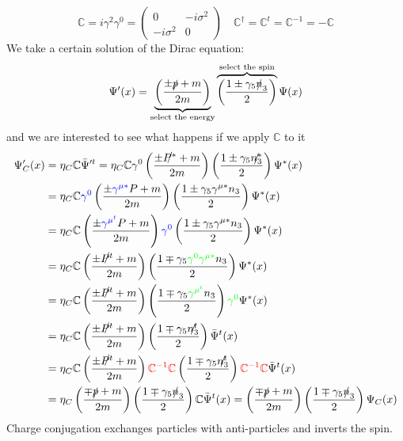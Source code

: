 \documentclass[../main.tex]{subfiles}
\begin{document}
\[
\mathbb{C}=i\gamma^2\gamma^0=\left(\begin{array}{cc}
    0 & -i\sigma^2 \\
    -i\sigma^2 & 0
\end{array}\right)
\quad \mathbb{C}^\dagger=\mathbb{C}^t=\mathbb{C}^{-1}=-\mathbb{C}
\]
We take a certain solution of the Dirac equation:
\[
\Psi'(x)=\underbrace{\left(\frac{\pm\slashed{p}+m}{2m}\right)}_{\text{select the energy}}\overbrace{\left(\frac{1\pm\gamma_5\slashed{n}_3}{2}\right)}^{\text{select the spin}}\Psi(x)
\]
and we are interested to see what happens if we apply $\mathbb{C}$ to it
\begin{align*}
\Psi'_C(x)&=\eta_C\mathbb{C}\bar{\Psi}'^t=\eta_C\mathbb{C}\gamma^0\left(\frac{\pm\slashed{P^*}+m}{2m}\right)\left(\frac{1\pm\gamma_5\slashed{n^*_3}}{2}\right)\Psi^*(x)\\
&=\eta_C\mathbb{C}{\color{blue}\gamma^0}\left(\frac{\pm{\color{blue}\gamma^{\mu*}}P+m}{2m}\right)\left(\frac{1\pm\gamma_5\gamma^{\mu*}n_3}{2}\right)\Psi^*(x)\\
&=\eta_C\mathbb{C}\left(\frac{\pm{\color{blue}\gamma^{\mu^t}}P+m}{2m}\right){\color{blue}\gamma^0}\left(\frac{1\pm\gamma_5\gamma^{\mu*}n_3}{2}\right)\Psi^*(x)\\
&=\eta_C\mathbb{C}\left(\frac{\pm\slashed{P^t}+m}{2m}\right)\left(\frac{1\mp\gamma_5{\color{green}\gamma^0\gamma^{\mu*}}n_3}{2}\right)\Psi^*(x)\\
&=\eta_C\mathbb{C}\left(\frac{\pm\slashed{P^t}+m}{2m}\right)\left(\frac{1\mp\gamma_5{\color{green}\gamma^{\mu^t}}n_3}{2}\right){\color{green}\gamma^0}\Psi^*(x)\\
&=\eta_C\mathbb{C}\left(\frac{\pm\slashed{P^t}+m}{2m}\right)\left(\frac{1\mp\gamma_5\slashed{n^t_3}}{2}\right)\bar{\Psi}^t(x)\\
&=\eta_C\mathbb{C}\left(\frac{\pm\slashed{P^t}+m}{2m}\right){\color{red}\mathbb{C}^{-1}\mathbb{C}}\left(\frac{1\mp\gamma_5\slashed{n^t_3}}{2}\right){\color{red}\mathbb{C}^{-1}\mathbb{C}}\bar{\Psi}^t(x)\\
&=\eta_C\left(\frac{\mp\slashed{p}+m}{2m}\right)\left(\frac{1\mp\gamma_5\slashed{n}_3}{2}\right)\mathbb{C}\bar{\Psi}^t(x)=\left(\frac{\mp\slashed{p}+m}{2m}\right)\left(\frac{1\mp\gamma_5\slashed{n}_3}{2}\right)\Psi_C(x)
\end{align*}
Charge conjugation exchanges particles with anti-particles and inverts the spin.
\end{document}
